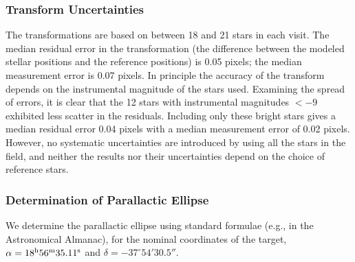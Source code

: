 \documentclass[12pt,preprint]{aastex}
\begin{document}
\subsubsection{Transform Uncertainties}

The transformations are based on between 18 and 21 stars in each visit.
The median residual error in the transformation
(the difference between the modeled
stellar positions and the reference positions) is 0.05 pixels; the median
measurement error is 0.07 pixels. 
In principle 
the accuracy of the transform depends on the instrumental magnitude of the
stars used. Examining the spread of errors, it is clear that the 12 stars with
instrumental magnitudes $<-9$ exhibited less scatter in the residuals. Including
only these bright stars gives a median residual error 0.04 pixels with a 
median measurement error of 0.02 pixels. However, no systematic uncertainties
are introduced by using all the stars in the field, and neither the
results nor their uncertainties depend on the choice of reference stars.


\subsubsection{Determination of Parallactic Ellipse}  

We determine the parallactic ellipse using standard formulae
(e.g., in the Astronomical Almanac), for the nominal coordinates
of the target,
$\alpha=18^{\rm h}56^{\rm m}35.11^{\rm s}$ and $\delta=-37^\circ 54' 30.5''$.


\end{document}
